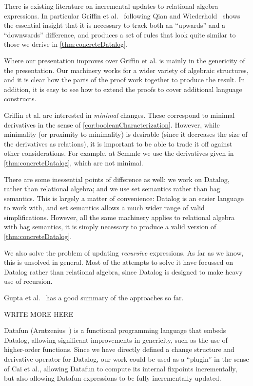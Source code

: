 There is existing literature on incremental updates to relational algebra
expressions. In particular Griffin et al.~\cite{griffin1997improved} following
Qian and Wiederhold~\cite{qian1991incremental} shows the essential insight that it is necessary to
track both an ``upwards'' and a ``downwards'' difference, and produces a set of
rules that look quite similar to those we derive in \ref{thm:concreteDatalog}.

Where our presentation improves over Griffin et al. is mainly in
the genericity of the presentation. Our machinery works for a wider variety of
algebraic structures, and it is clear how the parts of the proof work together
to produce the result. In addition, it is easy to see how to extend the proofs
to cover additional language constructs.

Griffin et al. are interested in \emph{minimal} changes. These correspond to
minimal derivatives in the sense of \ref{cor:booleanCharacterization}. However,
while minimality (or proximity to minimality) is desirable (since it decreases
the size of the derivatives as relations), it is important to be able to trade
it off against other considerations. For example, at
Semmle we use the derivatives given in \ref{thm:concreteDatalog}, which are not minimal.

There are some inessential points of difference as well: we work on Datalog,
rather than relational algebra; and we use set semantics rather than bag
semantics. This is largely a matter of convenience: Datalog is an easier
language to work with, and set semantics allows a much wider range of valid
simplifications. However, all the same machinery applies to relational algebra
with bag semantics, it is simply necessary to produce a valid version of \ref{thm:concreteDatalog}.

We also solve the problem of updating \emph{recursive} expressions. As far as we
know, this is unsolved in general. Most of the attempts to solve it have
focussed on Datalog rather than relational algebra, since Datalog is designed to
make heavy use of recursion. 

Gupta et al.~\cite{gupta1995maintenance} has a good summary of the approaches so far.

WRITE MORE HERE

Datafun (Arntzenius~\cite{arntz2016datafun}) is a functional programming language that embeds
Datalog, allowing significant improvements in genericity, such as the use of
higher-order functions. Since we have directly defined a change structure and
derivative operator for Datalog, our work could be used as a ``plugin'' in the sense
of Cai et al., allowing Datafun to compute its internal fixpoints
incrementally, but also allowing Datafun expressions to be fully incrementally updated.




